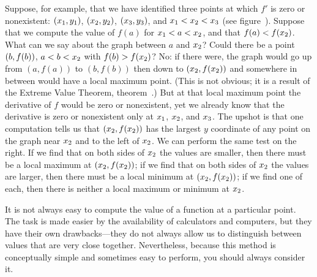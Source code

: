 Suppose, for example, that we have identified three points at which
$f'$ is zero or nonexistent: $\displaystyle (x_1,y_1)$, $\displaystyle (x_2,y_2)$, $\displaystyle (x_3,y_3)$,
and $\displaystyle x_1<x_2<x_3$ (see figure~). Suppose that we compute the value of $f(a)$ for $\displaystyle x_1<a<x_2$, and
that $\displaystyle f(a)<f(x_2)$. What can we say about the graph between $a$ and
$\displaystyle x_2$? Could there be a point $\displaystyle (b,f(b))$, $\displaystyle a<b<x_2$ with
$\displaystyle f(b)>f(x_2)$? No: if there were, the graph would go up from
$(a,f(a))$ to $(b,f(b))$ then down to $\displaystyle (x_2,f(x_2))$ and somewhere in
between would have a local maximum point. (This is not obvious; it is
a result of the Extreme Value Theorem, theorem~.)
But at that local maximum
point the derivative of $f$ would be zero or nonexistent, yet we
already know that the derivative is zero or nonexistent only at $\displaystyle x_1$,
$\displaystyle x_2$, and $\displaystyle x_3$. The upshot is that one computation tells us that
$\displaystyle (x_2,f(x_2))$ has the largest $y$ coordinate of any point on the
graph near $\displaystyle x_2$ and to the left of $\displaystyle x_2$. We can perform the same
test on the right. If we find that on both sides of $\displaystyle x_2$ the values
are smaller, then there must be a local maximum at $\displaystyle (x_2,f(x_2))$; if
we find that on both sides of $\displaystyle x_2$ the values are larger, then there
must be a local minimum at $\displaystyle (x_2,f(x_2))$; if we find one of each,
then there is neither a local maximum or minimum at $\displaystyle x_2$.


It is not always easy to compute the value of a function at a
particular point. The task is made easier by the availability of
calculators and computers, but they have their own drawbacks---they do
not always allow us to distinguish between values that are very close
together. Nevertheless, because this method is conceptually simple and
sometimes easy to perform, you should always consider it.

